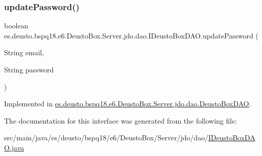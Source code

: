 \mbox{\label{interfacees_1_1deusto_1_1bspq18_1_1e6_1_1_deusto_box_1_1_server_1_1jdo_1_1dao_1_1_i_deusto_box_d_a_o_a578dbf0e8ac83f96643e06621afaa6ce}} 
\subsubsection{\texorpdfstring{update\+Password()}{updatePassword()}}
{\footnotesize\ttfamily boolean es.\+deusto.\+bspq18.\+e6.\+Deusto\+Box.\+Server.\+jdo.\+dao.\+I\+Deusto\+Box\+D\+A\+O.\+update\+Password (\begin{DoxyParamCaption}\item[{String}]{email,  }\item[{String}]{password }\end{DoxyParamCaption})}



Implemented in \mbox{\hyperlink{classes_1_1deusto_1_1bspq18_1_1e6_1_1_deusto_box_1_1_server_1_1jdo_1_1dao_1_1_deusto_box_d_a_o_aee61a6f577f75d59d725644c1fc47f6b}{es.\+deusto.\+bspq18.\+e6.\+Deusto\+Box.\+Server.\+jdo.\+dao.\+Deusto\+Box\+D\+AO}}.



The documentation for this interface was generated from the following file\+:\begin{DoxyCompactItemize}
\item 
src/main/java/es/deusto/bspq18/e6/\+Deusto\+Box/\+Server/jdo/dao/\mbox{\hyperlink{_i_deusto_box_d_a_o_8java}{I\+Deusto\+Box\+D\+A\+O.\+java}}\end{DoxyCompactItemize}
